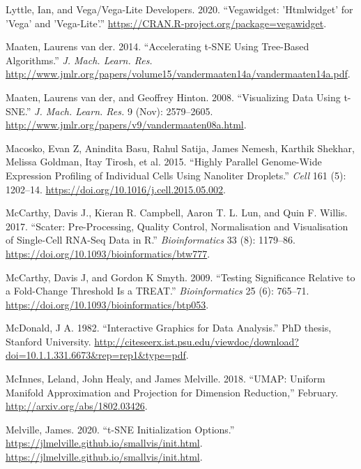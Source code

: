 \documentclass[article,notitle]{jdssv}
\begin{document}
\leavevmode\hypertarget{ref-Lyttle2020-hp}{}%
Lyttle, Ian, and Vega/Vega-Lite Developers. 2020. ``Vegawidget: 'Htmlwidget' for 'Vega' and 'Vega-Lite'.'' \url{https://CRAN.R-project.org/package=vegawidget}.

\leavevmode\hypertarget{ref-Van_Der_Maaten2014-zn}{}%
Maaten, Laurens van der. 2014. ``Accelerating t-SNE Using Tree-Based Algorithms.'' \emph{J. Mach. Learn. Res.} \url{http://www.jmlr.org/papers/volume15/vandermaaten14a/vandermaaten14a.pdf}.

\leavevmode\hypertarget{ref-Maaten2008-sk}{}%
Maaten, Laurens van der, and Geoffrey Hinton. 2008. ``Visualizing Data Using t-SNE.'' \emph{J. Mach. Learn. Res.} 9 (Nov): 2579--2605. \url{http://www.jmlr.org/papers/v9/vandermaaten08a.html}.

\leavevmode\hypertarget{ref-Macosko2015-ot}{}%
Macosko, Evan Z, Anindita Basu, Rahul Satija, James Nemesh, Karthik Shekhar, Melissa Goldman, Itay Tirosh, et al. 2015. ``Highly Parallel Genome-Wide Expression Profiling of Individual Cells Using Nanoliter Droplets.'' \emph{Cell} 161 (5): 1202--14. \url{https://doi.org/10.1016/j.cell.2015.05.002}.

\leavevmode\hypertarget{ref-McCarthy2017}{}%
McCarthy, Davis J., Kieran R. Campbell, Aaron T. L. Lun, and Quin F. Willis. 2017. ``Scater: Pre-Processing, Quality Control, Normalisation and Visualisation of Single-Cell RNA-Seq Data in R.'' \emph{Bioinformatics} 33 (8): 1179--86. \url{https://doi.org/10.1093/bioinformatics/btw777}.

\leavevmode\hypertarget{ref-McCarthy2009-qx}{}%
McCarthy, Davis J, and Gordon K Smyth. 2009. ``Testing Significance Relative to a Fold-Change Threshold Is a TREAT.'' \emph{Bioinformatics} 25 (6): 765--71. \url{https://doi.org/10.1093/bioinformatics/btp053}.

\leavevmode\hypertarget{ref-McDonald1982-ew}{}%
McDonald, J A. 1982. ``Interactive Graphics for Data Analysis.'' PhD thesis, Stanford University. \url{http://citeseerx.ist.psu.edu/viewdoc/download?doi=10.1.1.331.6673\&rep=rep1\&type=pdf}.

\leavevmode\hypertarget{ref-McInnes2018-co}{}%
McInnes, Leland, John Healy, and James Melville. 2018. ``UMAP: Uniform Manifold Approximation and Projection for Dimension Reduction,'' February. \url{http://arxiv.org/abs/1802.03426}.

\leavevmode\hypertarget{ref-Melville2020}{}%
Melville, James. 2020. ``t-SNE Initialization Options.'' \url{https://jlmelville.github.io/smallvis/init.html}. \url{https://jlmelville.github.io/smallvis/init.html}.
\end{document}

